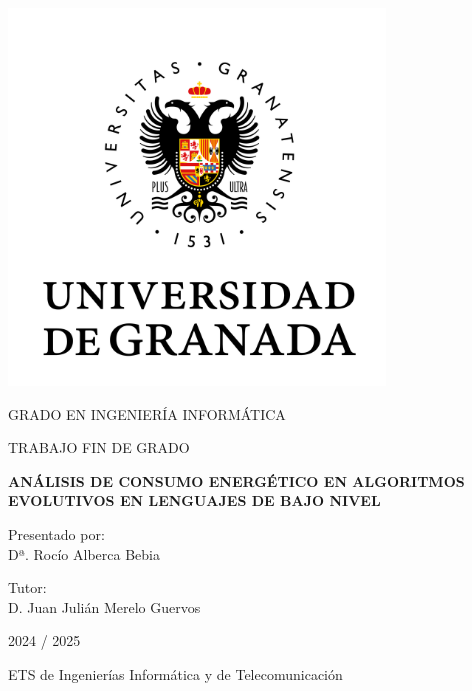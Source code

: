 \documentclass[12pt,a4paper,twoside]{book}
\begin{document}
\begin{titlepage}

\begin{center}

\includegraphics[width=10cm]{logo-ugr-1.png}

\vspace{8mm}


{\fontsize{14pt}{16pt} \selectfont GRADO EN INGENIERÍA INFORMÁTICA}

\vspace{8mm}


{\fontsize{14pt}{16pt} \selectfont TRABAJO FIN DE GRADO}

\vspace{10mm}

{\Large \textbf{ANÁLISIS DE CONSUMO ENERGÉTICO EN ALGORITMOS EVOLUTIVOS EN LENGUAJES DE BAJO NIVEL}} \\  

\vspace{25mm}

{\textmd{Presentado por:}} \\
{Dª. Rocío Alberca Bebia}

\vspace{2mm}

{\textmd{Tutor:}} \\
{D. Juan Julián Merelo Guervos}

\vspace{12mm}

{\textmd{\textnormal{2024 / 2025}}}

\vspace{2mm}

{\textmd{ETS de Ingenierías Informática y de Telecomunicación}}
\end{center}

\end{titlepage}
\end{document}
